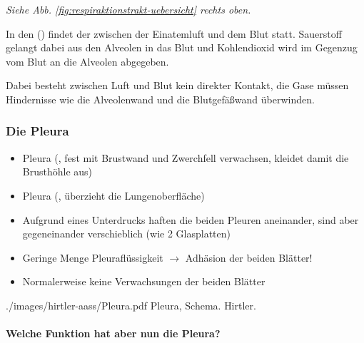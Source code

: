\emph{Siehe Abb. \ref{fig:respiraktionstrakt-uebersicht}
rechts oben.}

In den  () findet der
 zwischen der
Einatemluft und dem Blut statt. Sauerstoff gelangt dabei aus den Alveolen in das Blut und
Kohlendioxid wird im Gegenzug vom Blut an die Alveolen
abgegeben.

Dabei besteht zwischen Luft und Blut kein direkter Kontakt, die Gase
müssen Hindernisse wie die Alveolenwand und die Blutgefäßwand
überwinden.  



\subsubsection{Die Pleura}\label{topic:pleura}

{%
\begin{itemize}
    \item {} Pleura (, fest mit
    Brustwand und Zwerchfell verwachsen, kleidet damit die
    Brusthöhle aus)  
    \item {} Pleura (,
    überzieht die Lungenoberfläche)  
    \item Aufgrund eines Unterdrucks haften die beiden Pleuren aneinander,
    sind aber gegeneinander verschieblich (wie 2 Glasplatten)
    \item Geringe Menge Pleuraflüssigkeit ${\rightarrow}$ Adhäsion der
    beiden Blätter!
    \item Normalerweise keine Verwachsungen der beiden Blätter
\end{itemize}


}{}
{./images/hirtler-aass/Pleura.pdf}
{Pleura, Schema.}
{Hirtler.}




\paragraph{Welche Funktion hat aber nun die Pleura?}

